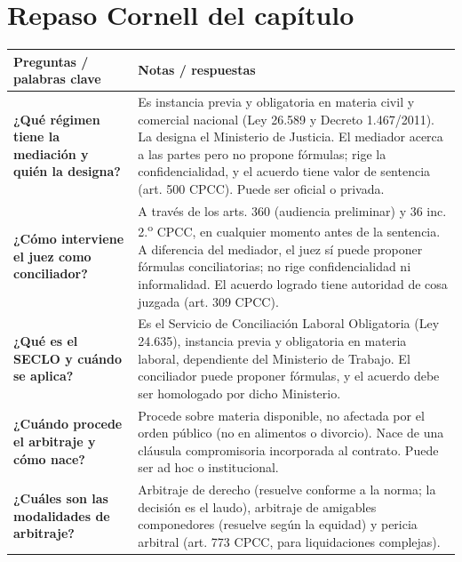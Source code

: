 \documentclass[12pt,oneside]{book}
\begin{document}
\section*{Repaso Cornell del capítulo}

\begin{table}[H]
\centering
\begin{tabularx}{\textwidth}{
    >{\raggedright\arraybackslash}p{}
    >{\raggedright\arraybackslash}X
}
\toprule
\textbf{Preguntas / palabras clave} & \textbf{Notas / respuestas} \\
\midrule

\textbf{¿Qué régimen tiene la mediación y quién la designa?} &
Es instancia previa y obligatoria en materia civil y comercial nacional (Ley 26.589 y Decreto 1.467/2011). La designa el Ministerio de Justicia. El mediador acerca a las partes pero no propone fórmulas; rige la confidencialidad, y el acuerdo tiene valor de sentencia (art. 500 CPCC). Puede ser oficial o privada. \\

\textbf{¿Cómo interviene el juez como conciliador?} &
A través de los arts. 360 (audiencia preliminar) y 36 inc. 2.\textsuperscript{o} CPCC, en cualquier momento antes de la sentencia. A diferencia del mediador, el juez sí puede proponer fórmulas conciliatorias; no rige confidencialidad ni informalidad. El acuerdo logrado tiene autoridad de cosa juzgada (art. 309 CPCC). \\

\textbf{¿Qué es el SECLO y cuándo se aplica?} &
Es el Servicio de Conciliación Laboral Obligatoria (Ley 24.635), instancia previa y obligatoria en materia laboral, dependiente del Ministerio de Trabajo. El conciliador puede proponer fórmulas, y el acuerdo debe ser homologado por dicho Ministerio. \\

\textbf{¿Cuándo procede el arbitraje y cómo nace?} &
Procede sobre materia disponible, no afectada por el orden público (no en alimentos o divorcio). Nace de una cláusula compromisoria incorporada al contrato. Puede ser ad hoc o institucional. \\

\textbf{¿Cuáles son las modalidades de arbitraje?} &
Arbitraje de derecho (resuelve conforme a la norma; la decisión es el laudo), arbitraje de amigables componedores (resuelve según la equidad) y pericia arbitral (art. 773 CPCC, para liquidaciones complejas). \\


\end{tabularx}
\end{table}
\end{document}
